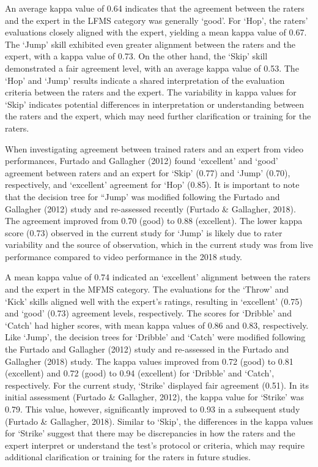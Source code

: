 \documentclass[
  man,
  colorlinks=true,linkcolor=blue,citecolor=blue,urlcolor=blue]{apa7}
\begin{document}
An average kappa value of 0.64 indicates that the agreement between the
raters and the expert in the LFMS category was generally `good'. For
`Hop', the raters' evaluations closely aligned with the expert, yielding
a mean kappa value of 0.67. The `Jump' skill exhibited even greater
alignment between the raters and the expert, with a kappa value of 0.73.
On the other hand, the `Skip' skill demonstrated a fair agreement level,
with an average kappa value of 0.53. The `Hop' and `Jump' results
indicate a shared interpretation of the evaluation criteria between the
raters and the expert. The variability in kappa values for `Skip'
indicates potential differences in interpretation or understanding
between the raters and the expert, which may need further clarification
or training for the raters.

When investigating agreement between trained raters and an expert from
video performances, Furtado and Gallagher (2012) found `excellent' and
`good' agreement between raters and an expert for `Skip' (0.77) and
`Jump' (0.70), respectively, and `excellent' agreement for `Hop' (0.85).
It is important to note that the decision tree for ``Jump' was modified
following the Furtado and Gallagher (2012) study and re-assessed
recently (Furtado \& Gallagher, 2018). The agreement improved from 0.70
(good) to 0.88 (excellent). The lower kappa score (0.73) observed in the
current study for `Jump' is likely due to rater variability and the
source of observation, which in the current study was from live
performance compared to video performance in the 2018 study.

A mean kappa value of 0.74 indicated an `excellent' alignment between
the raters and the expert in the MFMS category. The evaluations for the
`Throw' and `Kick' skills aligned well with the expert's ratings,
resulting in `excellent' (0.75) and `good' (0.73) agreement levels,
respectively. The scores for `Dribble' and `Catch' had higher scores,
with mean kappa values of 0.86 and 0.83, respectively. Like `Jump', the
decision trees for `Dribble' and `Catch' were modified following the
Furtado and Gallagher (2012) study and re-assessed in the Furtado and
Gallagher (2018) study. The kappa values improved from 0.72 (good) to
0.81 (excellent) and 0.72 (good) to 0.94 (excellent) for `Dribble' and
`Catch', respectively. For the current study, `Strike' displayed fair
agreement (0.51). In its initial assessment (Furtado \& Gallagher,
2012), the kappa value for `Strike' was 0.79. This value, however,
significantly improved to 0.93 in a subsequent study (Furtado \&
Gallagher, 2018). Similar to `Skip', the differences in the kappa values
for `Strike' suggest that there may be discrepancies in how the raters
and the expert interpret or understand the test's protocol or criteria,
which may require additional clarification or training for the raters in
future studies.
\end{document}
